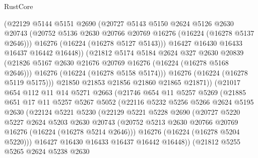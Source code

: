 \begin{lexlean}{RustCore}
\begin{coremodule}
                  (@22129
                    @5144
                    @5151
                    @2690
                    (@20727
                      @5143
                      @5150
                      @2624
                      @5126
                      @2630
                      @20743
                      (@20752 @5136 @2630 @20766 @20769 @16276 (@16224 (@16278 @5137 @2646)))
                      @16276
                      (@16224 (@16278 @5127 @5143)))
                    @16427
                    @16430
                    @16433
                    @16437
                    @16442
                    @16448))
                (@21812
                  @5174
                  @5184
                  @2624
                  @327
                  @2630
                  @20839
                  (@21826 @5167 @2630 @21676 @20769 @16276 (@16224 (@16278 @5168 @2646)))
                  @16276
                  (@16224 (@16278 @5158 @5174)))
                @16276
                (@16224 (@16278 @5119 @5175)))
              @21850
              @21853
              @21856
              @21860
              @21865
              @21871))
          (@21017
            @654
            @112
            @11
            @14
            @5271
            @2663
            (@21746
              @654
              @11
              @5257
              @5269
              (@21885
                @651
                @17
                @11
                @5257
                @5267
                @5052
                (@22116
                  @5232
                  @5256
                  @5266
                  @2624
                  @5195
                  @2630
                  (@22124
                    @5221
                    @5230
                    (@22129
                      @5221
                      @5228
                      @2690
                      (@20727
                        @5220
                        @5227
                        @2624
                        @5203
                        @2630
                        @20743
                        (@20752 @5213 @2630 @20766 @20769 @16276 (@16224 (@16278 @5214 @2646)))
                        @16276
                        (@16224 (@16278 @5204 @5220)))
                      @16427
                      @16430
                      @16433
                      @16437
                      @16442
                      @16448))
                  (@21812
                    @5255
                    @5265
                    @2624
                    @5238
                    @2630

\end{coremodule}
\end{lexlean}

